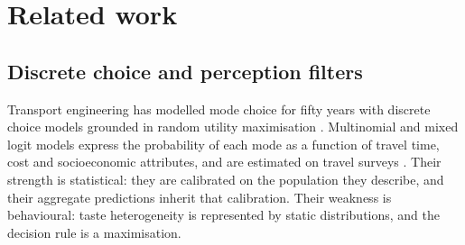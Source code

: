 
\section{Related work}
\label{sec:related}

\subsection{Discrete choice and perception filters}

Transport engineering has modelled mode choice for fifty years with discrete choice models grounded in random utility maximisation \citep{mcfadden1974conditional,benakiva1985discrete}. Multinomial and mixed logit models express the probability of each mode as a function of travel time, cost and socioeconomic attributes, and are estimated on travel surveys \citep{train2009discrete}. Their strength is statistical: they are calibrated on the population they describe, and their aggregate predictions inherit that calibration. Their weakness is behavioural: taste heterogeneity is represented by static distributions, and the decision rule is a maximisation.

